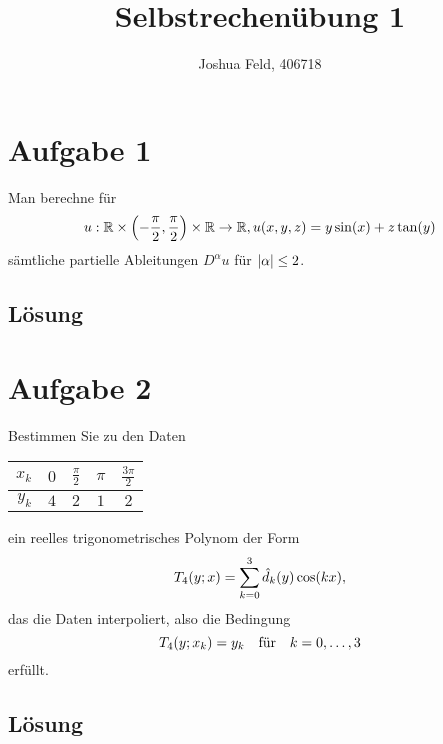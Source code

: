 \documentclass{exercise}
\institute{Applied and Computational Mathematics}
\title{Selbstrechenübung 1}
\author{Joshua Feld, 406718}
\begin{document}
    \maketitle


    \section*{Aufgabe 1}

    \begin{problem}
        Man berechne für
        \[
            u: \R \times \parentheses*{-\frac{\pi}{2}, \frac{\pi}{2}} \times \R \to \R, u\parentheses*{x, y, z} = y\sin\parentheses*{x} + z\tan\parentheses*{y}
        \]
        sämtliche partielle Ableitungen \(D^\alpha u\) für \(\absolute*{\alpha} \le 2\).
    \end{problem}

    \subsection*{Lösung}


    \section*{Aufgabe 2}

    \begin{problem}
        Bestimmen Sie zu den Daten
        \begin{center}
            \begin{tabular}{rcccc}
                \toprule
                \(x_k\) & \(0\) & \(\frac{\pi}{2}\) & \(\pi\) & \(\frac{3\pi}{2}\)\\
                \midrule
                \(y_k\) & \(4\) & \(2\) & \(1\) & \(2\)\\
                \bottomrule
            \end{tabular}
        \end{center}
        ein reelles trigonometrisches Polynom der Form
        \[
            T_4\parentheses*{y; x} = \sum_{k = 0}^3 \hat{d}_k\parentheses*{y}\cos\parentheses*{kx},
        \]
        das die Daten interpoliert, also die Bedingung
        \[
            T_4\parentheses*{y; x_k} = y_k \quad \text{für} \quad k = 0, \ldots, 3
        \]
        erfüllt.
    \end{problem}

    \subsection*{Lösung}
\end{document}
